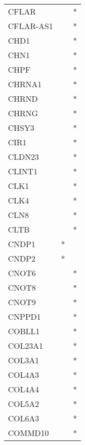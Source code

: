 \begin{longtable}{lcc}
CFLAR           &                &          * \\
CFLAR-AS1       &                &          * \\
CHD1            &                &          * \\
CHN1            &                &          * \\
CHPF            &                &          * \\
CHRNA1          &                &          * \\
CHRND           &                &          * \\
CHRNG           &                &          * \\
CHSY3           &                &          * \\
CIR1            &                &          * \\
CLDN23          &                &          * \\
CLINT1          &                &          * \\
CLK1            &                &          * \\
CLK4            &                &          * \\
CLN8            &                &          * \\
CLTB            &                &          * \\
CNDP1           &              * &            \\
CNDP2           &              * &            \\
CNOT6           &                &          * \\
CNOT8           &                &          * \\
CNOT9           &                &          * \\
CNPPD1          &                &          * \\
COBLL1          &                &          * \\
COL23A1         &                &          * \\
COL3A1          &                &          * \\
COL4A3          &                &          * \\
COL4A4          &                &          * \\
COL5A2          &                &          * \\
COL6A3          &                &          * \\
COMMD10         &                &          * \\

\end{longtable}
